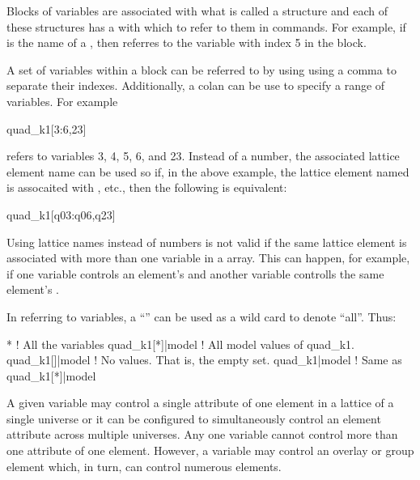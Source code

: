 Blocks of variables are associated with what is called a 
structure and each of these structures has a  with which to
refer to them in \tao commands. For example, if  is the
name of a , then  referres to the variable 
with index 5 in the block. 

A set of variables within a  block
can be referred to by using using a comma \vn{,} to
separate their indexes. Additionally, a colan \vn{:} can be use to
specify a range of variables. For example
\begin{example}
  quad_k1[3:6,23]
\end{example}
refers to variables 3, 4, 5, 6, and 23. Instead of a number, the
associated lattice element name can be used so if, in the above
example, the lattice element named  is assocaited with
, etc., then the following is equivalent:
\begin{example}
  quad_k1[q03:q06,q23]
\end{example}
Using lattice names instead of numbers is not valid if the same
lattice element is associated with more than one variable in a
 array. This can happen, for example, if one variable controls
an element's  and another variable controlls the same element's
. 

In referring to variables, a ``\vn{*}'' can be used as a wild card to 
denote ``all''. Thus:
\begin{example}
  *                ! All the variables
  quad_k1[*]|model ! All model values of quad_k1.
  quad_k1[]|model  ! No values. That is, the empty set.
  quad_k1|model    ! Same as quad_k1[*]|model
\end{example}

A given variable may control a single attribute of one element in a
 lattice of a single universe or it can be configured to
simultaneously control an element attribute across multiple
universes. Any one variable cannot control more than one attribute of
one element. However, a variable may control an overlay or group
element which, in turn, can control numerous elements.

